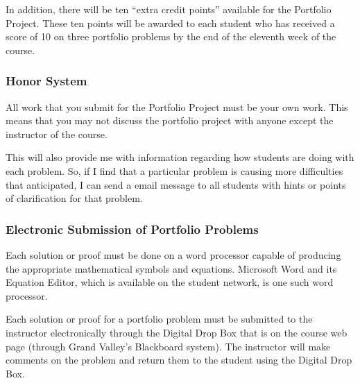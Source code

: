 In addition, there will be ten ``extra credit points'' available for the Portfolio Project.  These ten points  will be awarded to each student who has received a score of 10 on three portfolio problems by the end of the eleventh week of the course.

\subsubsection*{Honor System}
All work that you submit for the Portfolio Project must be your own work.  This means that you may not discuss the portfolio project with anyone except the instructor of the course.

This will also provide me with information regarding how students are doing with each problem.  So, if I find that a particular problem is causing more difficulties that anticipated, I can send a email message to all students with hints or points of clarification for that problem.

\subsubsection*{Electronic Submission of Portfolio Problems}
Each solution or proof must be done on a word processor capable of producing the appropriate mathematical symbols and equations.   Microsoft Word and its Equation Editor, which is available on the student network, is one such word processor.

Each solution or proof for a portfolio problem must be submitted to the instructor electronically through the Digital Drop Box that is on the course web page (through Grand Valley's Blackboard system).  The instructor will make comments on the problem and return them to the student using the Digital Drop Box.






\endinput
